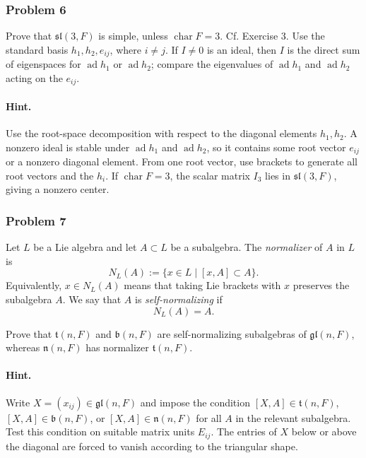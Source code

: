 \documentclass[12pt, a4paper]{article}
\begin{document}
\subsubsection{Problem 6}

Prove that \(\mathfrak{sl}(3,F)\) is simple, unless \(\operatorname{char} F=3\).
Cf. Exercise 3. Use the standard basis \(h_1,h_2,e_{ij}\), where \(i \neq j\).
If \(I \neq 0\) is an ideal, then \(I\) is the direct sum of eigenspaces for
\(\operatorname{ad} h_1\) or \(\operatorname{ad} h_2\); compare the eigenvalues
of \(\operatorname{ad} h_1\) and \(\operatorname{ad} h_2\) acting on the
\(e_{ij}\).

\paragraph{Hint.}
Use the root-space decomposition with respect to the diagonal elements
\(h_1,h_2\). A nonzero ideal is stable under \(\operatorname{ad}h_1\) and
\(\operatorname{ad}h_2\), so it contains some root vector \(e_{ij}\) or a
nonzero diagonal element. From one root vector, use brackets to generate all
root vectors and the \(h_i\). If \(\operatorname{char}F=3\), the scalar matrix
\(I_3\) lies in \(\mathfrak{sl}(3,F)\), giving a nonzero center.

\subsubsection{Problem 7}
Let \(L\) be a Lie algebra and let \(A\subset L\) be a subalgebra. The
\emph{normalizer} of \(A\) in \(L\) is
\[
N_L(A):=\{x\in L\mid [x,A]\subset A\}.
\]
Equivalently, \(x\in N_L(A)\) means that taking Lie brackets with \(x\)
preserves the subalgebra \(A\). We say that \(A\) is \emph{self-normalizing} if
\[
N_L(A)=A.
\]


Prove that \(\mathfrak{t}(n,F)\) and \(\mathfrak{b}(n,F)\) are
self-normalizing subalgebras of \(\mathfrak{gl}(n,F)\), whereas
\(\mathfrak{n}(n,F)\) has normalizer \(\mathfrak{t}(n,F)\).

\paragraph{Hint.}
Write \(X=(x_{ij})\in \mathfrak{gl}(n,F)\) and impose the condition
\([X,A]\in \mathfrak{t}(n,F)\), \([X,A]\in \mathfrak{b}(n,F)\), or
\([X,A]\in \mathfrak{n}(n,F)\) for all \(A\) in the relevant subalgebra. Test
this condition on suitable matrix units \(E_{ij}\). The entries of \(X\) below
or above the diagonal are forced to vanish according to the triangular shape.
\end{document}
